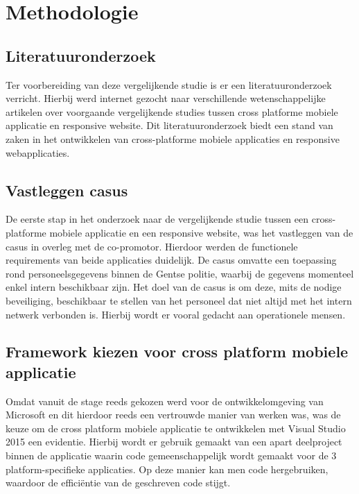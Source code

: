
\chapter{Methodologie}
\label{ch:methodologie}


\section{Literatuuronderzoek}
Ter voorbereiding van deze vergelijkende studie is er een literatuuronderzoek verricht.
Hierbij werd internet gezocht naar verschillende wetenschappelijke artikelen over voorgaande vergelijkende studies
tussen cross platforme mobiele applicatie en responsive website. Dit literatuuronderzoek biedt
een stand van zaken in het ontwikkelen van cross-platforme mobiele applicaties en responsive webapplicaties.

\section{Vastleggen casus}
De eerste stap in het onderzoek naar de vergelijkende studie tussen een cross-platforme mobiele applicatie en een
responsive website, was het vastleggen van de casus in overleg met de co-promotor. Hierdoor werden de functionele requirements van beide applicaties duidelijk.
De casus omvatte een toepassing rond personeelsgegevens binnen de Gentse politie,
waarbij de gegevens momenteel enkel intern beschikbaar zijn. Het doel van de casus is om deze, mits de nodige beveiliging, beschikbaar
te stellen van het personeel dat niet altijd met het intern netwerk verbonden is. Hierbij wordt er vooral gedacht aan operationele mensen.

\section{Framework kiezen voor cross platform mobiele applicatie}
Omdat vanuit de stage reeds gekozen werd voor de ontwikkelomgeving van Microsoft en dit hierdoor reeds een vertrouwde
manier van werken was, was de keuze om de cross platform mobiele applicatie te ontwikkelen met Visual Studio 2015 een evidentie.
Hierbij wordt er gebruik gemaakt van een apart deelproject binnen de applicatie waarin code gemeenschappelijk wordt gemaakt voor
de 3 platform-specifieke applicaties. Op deze manier kan men code hergebruiken, waardoor de efficiëntie van de geschreven code stijgt.

